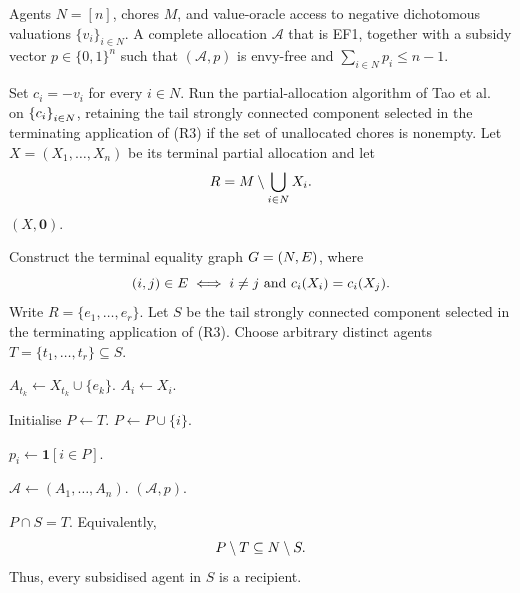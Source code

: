 \begin{algorithm}[H]
\caption{EF1 allocation with at most one unit of subsidy per agent for negative dichotomous valuations}
\label{alg:main}
\begin{algorithmic}[1]
\Require Agents $N=[n]$, chores $M$, and value-oracle access to negative
dichotomous valuations $\{v_i\}_{i\in N}$.
\Ensure A complete allocation $\mathcal{A}$ that is EF1, together with a
subsidy vector $p\in\{0,1\}^n$ such that $(\mathcal{A},p)$ is envy-free and
$\sum_{i\in N}p_i\le n-1$.

\State Set $c_i=-v_i$ for every $i\in N$.
\State Run the partial-allocation algorithm of Tao et al.~\cite{tao2025existence} on $\left\{c_i\right\}_{i\in N}$, retaining the tail strongly connected component selected in the terminating application of  \textnormal{(R3)} if the set of unallocated chores is nonempty.
\State Let $X=(X_1,\dots,X_n)$ be its terminal partial allocation and let
\[
R=M\setminus\bigcup_{i\in N}X_i .
       \]
    \State \Return $(X,\mathbf 0)$.
\EndIf

\State Construct the terminal equality graph $G=(N,E)$, where
       \[
       (i,j)\in E
       \iff
       i\neq j
       \text{ and }
       c_i(X_i)=c_i(X_j).
       \]
\State Write $R=\{e_1,\ldots,e_r\}$.
\State Let $S$ be the tail strongly connected component selected in the
       terminating application of \textnormal{(R3)}.
\State Choose arbitrary distinct agents
      $T=\{t_1,\ldots,t_r\}\subseteq S$.

    \State $A_{t_k}\gets X_{t_k}\cup\{e_k\}$.
\EndFor
{}
    \State $A_i\gets X_i$.
\EndFor

\State Initialise $P\gets T$.
    \State $P\gets P\cup\{i\}$.
\EndWhile

    \State $p_i\gets \mathbf{1}[i\in P]$.
\EndFor

\State $\mathcal{A}\gets(A_1,\ldots,A_n)$.
\State \Return $(\mathcal{A},p)$.
\end{algorithmic}
\end{algorithm}


\begin{lemma}
\label{lem:m-Pstructure}
$P\cap S=T$. Equivalently,
\[P\setminus T\subseteq N\setminus S.
\]
Thus, every subsidised agent in $S$ is a recipient.
\end{lemma}

